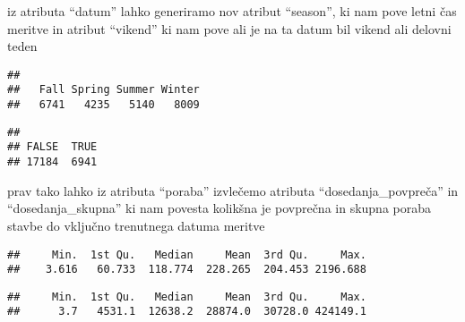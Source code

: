 \documentclass[
]{article}
\newenvironment{Shaded}{\begin{snugshade}}{\end{snugshade}}
\newcommand{\FunctionTok}[1]{\textcolor[rgb]{0.00,0.00,0.00}{#1}}
\newcommand{\NormalTok}[1]{#1}
\newcommand{\SpecialCharTok}[1]{\textcolor[rgb]{0.00,0.00,0.00}{#1}}
\begin{document}
iz atributa ``datum'' lahko generiramo nov atribut ``season'', ki nam
pove letni čas meritve in atribut ``vikend'' ki nam pove ali je na ta
datum bil vikend ali delovni teden

\begin{Shaded}
\end{Shaded}

\begin{verbatim}
## 
##   Fall Spring Summer Winter 
##   6741   4235   5140   8009
\end{verbatim}

\begin{Shaded}
\end{Shaded}

\begin{verbatim}
## 
## FALSE  TRUE 
## 17184  6941
\end{verbatim}

prav tako lahko iz atributa ``poraba'' izvlečemo atributa
``dosedanja\_povpreča'' in ``dosedanja\_skupna'' ki nam povesta kolikšna
je povprečna in skupna poraba stavbe do vključno trenutnega datuma
meritve

\begin{Shaded}
\end{Shaded}

\begin{verbatim}
##     Min.  1st Qu.   Median     Mean  3rd Qu.     Max. 
##    3.616   60.733  118.774  228.265  204.453 2196.688
\end{verbatim}

\begin{Shaded}
\end{Shaded}

\begin{verbatim}
##     Min.  1st Qu.   Median     Mean  3rd Qu.     Max. 
##      3.7   4531.1  12638.2  28874.0  30728.0 424149.1
\end{verbatim}
\end{document}
